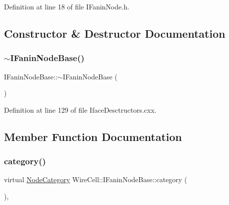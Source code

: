 Definition at line 18 of file I\+Fanin\+Node.\+h.



\subsection{Constructor \& Destructor Documentation}
\mbox{\label{class_wire_cell_1_1_i_fanin_node_base_a34a12b984eb778c5fbc443c9f7eae666}} 
\subsubsection{\texorpdfstring{$\sim$\+I\+Fanin\+Node\+Base()}{~IFaninNodeBase()}}
{\footnotesize\ttfamily I\+Fanin\+Node\+Base\+::$\sim$\+I\+Fanin\+Node\+Base (\begin{DoxyParamCaption}{ }\end{DoxyParamCaption})\hspace{0.3cm}{\ttfamily [virtual]}}



Definition at line 129 of file Iface\+Desctructors.\+cxx.



\subsection{Member Function Documentation}
\mbox{\label{class_wire_cell_1_1_i_fanin_node_base_a1eadd634e7beaafcd7d0e93ea35a6f3b}} 
\subsubsection{\texorpdfstring{category()}{category()}}
{\footnotesize\ttfamily virtual \hyperlink{class_wire_cell_1_1_i_node_a5546e64cbb70bd3ac787295cac9ac803}{Node\+Category} Wire\+Cell\+::\+I\+Fanin\+Node\+Base\+::category (\begin{DoxyParamCaption}{ }\end{DoxyParamCaption})\hspace{0.3cm}{\ttfamily [inline]}, {\ttfamily [virtual]}}



